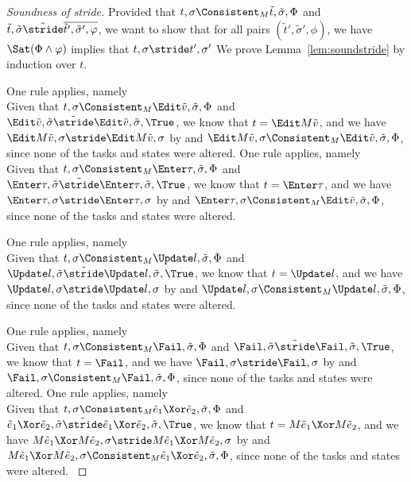 \begin{proof}[Soundness of stride]

  Provided that $t,\sigma\Consistent_M\tilde{t},\tilde{\sigma},\Phi$ and $\tilde{t},\tilde{\sigma}\tilde{\stride} \overline{\tilde{t}',\tilde{\sigma}',\phi}$,
  we want to show that for all pairs $(\tilde{t}',\tilde{\sigma}',\phi)$,
  we have $\Sat(\Phi\land\phi)$ implies that $t,\sigma\stride t',\sigma'$
  We prove Lemma~\ref{lem:soundstride} by induction over $t$.



  { One rule applies, namely \\
    Given that $t,\sigma\Consistent_M\Edit\tilde{v},\tilde{\sigma},\Phi$ and $\Edit\tilde{v},\tilde{\sigma}\tilde{\stride}\Edit\tilde{v},\tilde{\sigma},\True$,
    we know that $t=\Edit M \tilde{v}$, and we have $\Edit M \tilde{v},\sigma\stride\Edit M\tilde{v},\sigma$ by  and
    $\Edit M \tilde{v},\sigma\Consistent_M\Edit\tilde{v},\tilde{\sigma},\Phi$, since none of the tasks and states were altered.
   }
  {One rule applies, namely \\
  Given that $t,\sigma\Consistent_M\Enter \tau,\tilde{\sigma},\Phi$ and $\Enter \tau,\tilde{\sigma}\tilde{\stride}\Enter \tau,\tilde{\sigma},\True$,
  we know that $t=\Enter \tau$, and we have $\Enter \tau,\sigma\stride\Enter \tau,\sigma$ by  and
  $\Enter \tau,\sigma\Consistent_M\Edit\tilde{v},\tilde{\sigma},\Phi$, since none of the tasks and states were altered.
  }

   {One rule applies, namely \\
   Given that $t,\sigma\Consistent_M\Update l,\tilde{\sigma},\Phi$ and $\Update l,\tilde{\sigma}\tilde{\stride}\Update l,\tilde{\sigma},\True$,
   we know that $t=\Update l$, and we have $\Update l,\sigma\stride\Update l,\sigma$ by  and
   $\Update l,\sigma\Consistent_M\Update l,\tilde{\sigma},\Phi$, since none of the tasks and states were altered.
  }

   {One rule applies, namely \\
   Given that $t,\sigma\Consistent_M\Fail,\tilde{\sigma},\Phi$ and $\Fail,\tilde{\sigma}\tilde{\stride}\Fail,\tilde{\sigma},\True$,
   we know that $t=\Fail$, and we have $\Fail,\sigma\stride\Fail,\sigma$ by  and
   $\Fail,\sigma\Consistent_M\Fail,\tilde{\sigma},\Phi$, since none of the tasks and states were altered.
   }
   {One rule applies, namely \\
   Given that $t,\sigma\Consistent_M\tilde{e}_1\Xor \tilde{e}_2,\tilde{\sigma},\Phi$ and $\tilde{e}_1\Xor \tilde{e}_2,\tilde{\sigma}\tilde{\stride}\tilde{e}_1\Xor \tilde{e}_2,\tilde{\sigma},\True$,
   we know that $t=M\tilde{e}_1\Xor M\tilde{e}_2$, and we have $M\tilde{e}_1\Xor M\tilde{e}_2,\sigma\stride M\tilde{e}_1\Xor M\tilde{e}_2,\sigma$ by  and
   $M\tilde{e}_1\Xor M\tilde{e}_2,\sigma\Consistent_M\tilde{e}_1\Xor \tilde{e}_2,\tilde{\sigma},\Phi$, since none of the tasks and states were altered.
   }





\end{proof}
